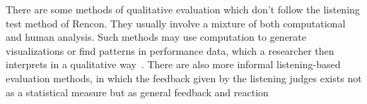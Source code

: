 There are some methods of qualitative evaluation which don't follow the listening test method of Rencon. They usually involve a mixture of both computational and human analysis. Such methods may use computation to generate visualizations or find patterns in performance data, which a researcher then interprets in a qualitative way~\cite{widmer2009yqx,jeong2019score, grachten2012linear}. There are also more informal listening-based evaluation methods, in which the feedback given by the listening judges exists not as a statistical measure but as general feedback and reaction~\cite{oore2020time}
